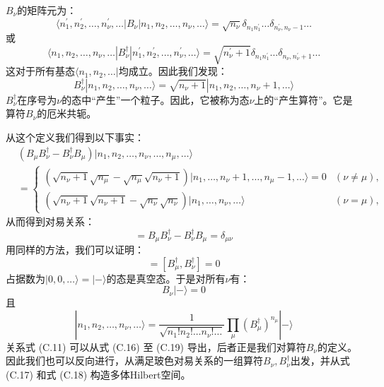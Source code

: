 $B_{\nu}$的矩阵元为：
\begin{equation}
\langle n^{\prime}_{1},n^{\prime}_{2},\dots,n^{\prime}_{\nu},\dots|B_{\nu}|n_{1},n_{2},\dots,n_{\nu},\dots\rangle=\sqrt{n_{\nu}}\delta_{n_{1}n^{\prime}_{1}}\dots\delta_{n^{\prime}_{\nu},n_{\nu}-1}\dots\label{eq:appendix_c_boson_annihilation_matrix}
\end{equation}
或
\begin{equation}
\langle n_{1},n_{2},\dots,n_{\nu},\dots|B^{\dagger}_{\nu}|n^{\prime}_{1},n^{\prime}_{2},\dots,n^{\prime}_{\nu},\dots\rangle=\sqrt{n^{\prime}_{\nu}+1}\delta_{n_{1}n^{\prime}_{1}}\dots\delta_{n_{\nu},n^{\prime}_{\nu}+1}\dots\label{eq:appendix_c_boson_creation_matrix}
\end{equation}
这对于所有基态$\langle n_{1},n_{2},\dots|$均成立。因此我们发现：
\begin{equation}
B^{\dagger}_{\nu}|n_{1},n_{2},\dots,n_{\nu},\dots\rangle=\sqrt{n_{\nu}+1}|n_{1},n_{2},\dots,n_{\nu}+1,\dots\rangle\label{eq:appendix_c_boson_creation}
\end{equation}
$B^{\dagger}_{\nu}$在序号为$\nu$的态中“产生”一个粒子。因此，它被称为态$\nu$上的“产生算符”。它是算符$B_{\nu}$的厄米共轭。

从这个定义我们得到以下事实：
\begin{align}
 & (B_{\mu}B^{\dagger}_{\nu}-B^{\dagger}_{\nu}B_{\mu})|n_{1},n_{2},\dots,n_{\nu},\dots,n_{\mu},\dots\rangle\nonumber \\
 & =\begin{cases}
(\sqrt{n_{\nu}+1}\sqrt{n_{\mu}}-\sqrt{n_{\mu}}\sqrt{n_{\nu}+1})|n_{1},\dots,n_{\nu}+1,\dots,n_{\mu}-1,\dots\rangle=0 & (\nu\neq\mu),\\
(\sqrt{n_{\nu}+1}\sqrt{n_{\nu}+1}-\sqrt{n_{\nu}}\sqrt{n_{\nu}})|n_{1},\dots,n_{\nu},\dots\rangle & (\nu=\mu),
\end{cases}\label{eq:appendix_c_boson_comm_action}
\end{align}
从而得到对易关系：
\begin{equation}
[B_{\mu},B^{\dagger}_{\nu}]=B_{\mu}B^{\dagger}_{\nu}-B^{\dagger}_{\nu}B_{\mu}=\delta_{\mu\nu}\label{eq:appendix_c_boson_commutator}
\end{equation}
用同样的方法，我们可以证明：
\begin{equation}
[B_{\mu},B_{\nu}]=[B^{\dagger}_{\mu},B^{\dagger}_{\nu}]=0\label{eq:appendix_c_boson_other_commutators}
\end{equation}
占据数为$|0,0,\dots\rangle=|-\rangle$的态是真空态。于是对所有$\nu$有：
\begin{equation}
B_{\nu}|-\rangle=0\label{eq:appendix_c_vacuum_annihilation}
\end{equation}
且
\begin{equation}
|n_{1},n_{2},\dots,n_{\nu},\dots\rangle=\frac{1}{\sqrt{n_{1}!n_{2}!\dots n_{\nu}!\dots}}\prod_{\mu}(B^{\dagger}_{\mu})^{n_{\mu}}|-\rangle\label{eq:appendix_c_boson_state_creation}
\end{equation}
关系式 (C.11) 可以从式 (C.16) 至 (C.19) 导出，后者正是我们对算符$B_{\nu}$的定义。因此我们也可以反向进行，从满足玻色对易关系的一组算符$B_{\nu},B^{\dagger}_{\nu}$出发，并从式
(C.17) 和式 (C.18) 构造多体Hilbert空间。

